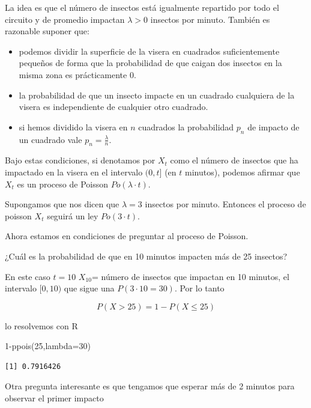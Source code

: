 \documentclass[
  letterpaper,
  DIV=11,
  numbers=noendperiod]{scrreprt}
\newenvironment{Shaded}{\begin{snugshade}}{\end{snugshade}}
\newcommand{\AttributeTok}[1]{\textcolor[rgb]{0.40,0.45,0.13}{#1}}
\newcommand{\DecValTok}[1]{\textcolor[rgb]{0.68,0.00,0.00}{#1}}
\newcommand{\FunctionTok}[1]{\textcolor[rgb]{0.28,0.35,0.67}{#1}}
\newcommand{\NormalTok}[1]{\textcolor[rgb]{0.00,0.23,0.31}{#1}}
\newcommand{\SpecialCharTok}[1]{\textcolor[rgb]{0.37,0.37,0.37}{#1}}
\providecommand{\tightlist}{%
  \setlength{\itemsep}{0pt}\setlength{\parskip}{0pt}}\usepackage{longtable,booktabs,array}
\begin{document}
La idea es que el número de insectos está igualmente repartido por todo
el circuito y de promedio impactan \(\lambda>0\) insectos por minuto.
También es razonable suponer que:

\begin{itemize}
\tightlist
\item
  podemos dividir la superficie de la visera en cuadrados
  suficientemente pequeños de forma que la probabilidad de que caigan
  dos insectos en la misma zona es prácticamente 0.
\item
  la probabilidad de que un insecto impacte en un cuadrado cualquiera de
  la visera es independiente de cualquier otro cuadrado.
\item
  si hemos dividido la visera en \(n\) cuadrados la probabilidad \(p_n\)
  de impacto de un cuadrado vale \(p_n=\frac{\lambda}{n}\).
\end{itemize}

Bajo estas condiciones, si denotamos por \(X_t\) como el número de
insectos que ha impactado en la visera en el intervalo \((0,t]\) (en
\(t\) minutos), podemos afirmar que \(X_t\) es un proceso de Poisson
\(Po(\lambda\cdot t)\).

Supongamos que nos dicen que \(\lambda=3\) insectos por minuto. Entonces
el proceso de poisson \(X_t\) seguirá un ley \(Po(3\cdot t).\)

Ahora estamos en condiciones de preguntar al proceso de Poisson.

¿Cuál es la probabilidad de que en 10 minutos impacten más de 25
insectos?

En este caso \(t=10\) \(X_{10}\)= número de insectos que impactan en 10
minutos, el intervalo \([0,10)\) que sigue una \(P(3\cdot 10=30)\). Por
lo tanto

\[P(X>25)=1-P(X\leq 25)\]

lo resolvemos con R

\begin{Shaded}
\begin{Highlighting}[]
\DecValTok{1}\SpecialCharTok{{-}}\FunctionTok{ppois}\NormalTok{(}\DecValTok{25}\NormalTok{,}\AttributeTok{lambda=}\DecValTok{30}\NormalTok{)}
\end{Highlighting}
\end{Shaded}

\begin{verbatim}
[1] 0.7916426
\end{verbatim}

Otra pregunta interesante es que tengamos que esperar más de 2 minutos
para observar el primer impacto
\end{document}
